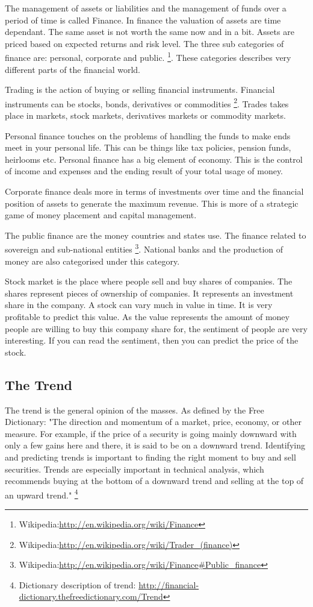 
The management of assets or liabilities and the management of funds over a
period of time is called Finance. In finance the valuation of assets are time
dependant. The same asset is not worth the same now and in a bit. Assets are
priced based on expected returns and risk level. The three sub categories of
finance are: personal, corporate and public. 
\footnote{Wikipedia:\url{http://en.wikipedia.org/wiki/Finance}}.
These categories describes very different parts of the financial world. 

Trading is the action of buying or selling financial instruments.
Financial instruments can be stocks, bonds, derivatives or commodities 
\footnote{Wikipedia:\url{http://en.wikipedia.org/wiki/Trader_(finance)}}.
Trades takes place in markets,  stock markets, derivatives markets or commodity
markets.

Personal finance touches on the problems of handling the funds to make ends
meet in your personal life. This can be things like tax policies, pension
funds, heirlooms etc. Personal finance has a big element of economy. This is
the control of income and expenses and the ending result of your total usage of
money.  

Corporate finance deals more in terms of investments over time and the
financial position of assets to generate the maximum revenue. This is more of a
strategic game of money placement and capital management. 

The public finance are the money countries and states use. The finance related
to sovereign and sub-national entities
\footnote{Wikipedia:\url{http://en.wikipedia.org/wiki/Finance#Public_finance}}.
National banks and the production of money are also categorised under this
category.

Stock market is the place where people sell and buy shares of companies. The
shares represent pieces of ownership of companies. It represents an
investment share in the company. A stock can vary much in value in time. It is
very profitable to predict this value. As the value represents the amount of
money people are willing to buy this company share for, the sentiment of people
are very interesting. If you can read the sentiment, then you can predict the
price of the stock.  

\subsection{The Trend}
The trend is the general opinion of the masses. As defined by the Free
Dictionary:  
"The direction and momentum of a market, price, economy, or other measure. For
example, if the price of a security is going mainly downward with only a few
gains here and there, it is said to be on a downward trend. Identifying and
predicting trends is important to finding the right moment to buy and sell
securities. Trends are especially important in technical analysis, which
recommends buying at the bottom of a downward trend and selling at the top of an
upward trend."
\footnote{Dictionary description of trend: \url{http://financial-dictionary.thefreedictionary.com/Trend}}

